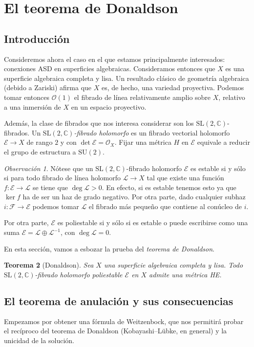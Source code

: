\documentclass[12pt, a4paper]{amsart}
\newcommand\CC{\mathbb{C}}
\newcommand\SL{\mathrm{SL}}
\newcommand\FF{\mathscr{F}}
\newcommand\EE{\mathscr{E}}
\newcommand\LL{\mathscr{L}}
\newcommand\OO{\mathscr{O}}
\newtheorem{thm}{Teorema}[section]
\theoremstyle{remark} \newtheorem{rmk}[thm]{Observación}
\theoremstyle{remark} \newtheorem{rmks}[thm]{Observaciones}
\theoremstyle{definition} \newtheorem{defn}[thm]{Definición}
\theoremstyle{definition} \newtheorem{ejs}[thm]{Ejemplos}
\theoremstyle{definition} \newtheorem{ej}[thm]{Ejemplo}
\begin{document}
\section{El teorema de Donaldson}
\subsection{Introducción}
Consideremos ahora el caso en el que estamos principalmente interesados: conexiones ASD en superficies algebraicas. Consideramos entonces que $X$ es una superficie algebraica completa y lisa. Un resultado clásico de geometría algebraica (debido a Zariski) afirma que $X$ es, de hecho, una variedad proyectiva. Podemos tomar entonces $\OO(1)$ el fibrado de línea relativamente amplio sobre $X$, relativo a una inmersión de $X$ en un espacio proyectivo.

Además, la clase de fibrados que nos interesa considerar son los $\SL(2,\CC)$-fibrados. Un \emph{$\SL(2,\CC)$-fibrado holomorfo} es un fibrado vectorial holomorfo $\EE\rightarrow X$ de rango $2$ y con $\det \EE=\OO_X$. Fijar una métrica $H$ en $\EE$ equivale a reducir el grupo de estructura a $\mathrm{SU}(2)$.

\begin{rmk}
	Nótese que un $\SL(2,\CC)$-fibrado holomorfo $\EE$ es estable si y sólo si para todo fibrado de línea holomorfo $\LL\rightarrow X$ tal que existe una función $f:\EE\rightarrow \LL$ se tiene que $\deg \LL >0$. En efecto, si es estable tenemos esto ya que $\ker f$ ha de ser un haz de grado negativo. Por otra parte, dado cualquier subhaz $i:\FF\rightarrow \EE$ podemos tomar $\LL$ el fibrado más pequeño que contiene al conúcleo de $i$.

	Por otra parte, $\EE$ es poliestable si y sólo si es estable o puede escribirse como una suma  $\EE=\LL \oplus \LL^{-1}$, con $\deg \LL=0$.
\end{rmk}

En esta sección, vamos a esbozar la prueba del \emph{teorema de Donaldson}.

\begin{thm}[Donaldson] \label{Donaldson}
Sea $X$ una superficie algebraica completa y lisa. Todo $\SL(2,\CC)$-fibrado holomorfo poliestable $\EE$ en $X$ admite una métrica HE.	
\end{thm}

\subsection{El teorema de anulación y sus consecuencias} 
Empezamos por obtener una fórmula de Weitzenbock, que nos permitirá probar el recíproco del teorema de Donaldson (Kobayashi--Lübke, en general) y la unicidad de la solución. 
\end{document}
